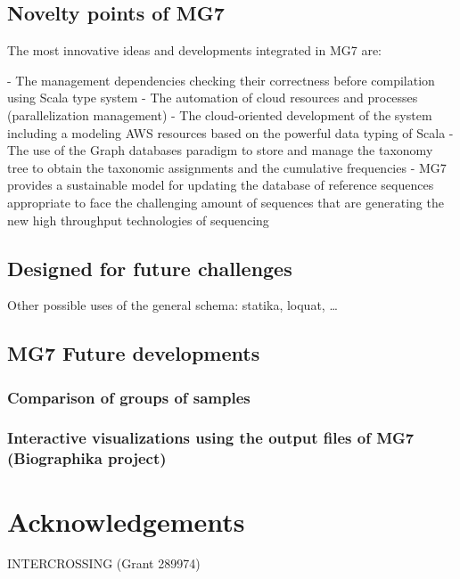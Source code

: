 \documentclass{frontiersSCNS} %
\begin{document}
\subsection{Novelty points of MG7}\label{novelty-points-of-mg7}

The most innovative ideas and developments integrated in MG7 are:

­- The management dependencies checking their correctness before
compilation using Scala type system - The automation of cloud resources
and processes (parallelization management) - The cloud-oriented
development of the system including a modeling AWS resources based on
the powerful data typing of Scala - The use of the Graph databases
paradigm to store and manage the taxonomy tree to obtain the taxonomic
assignments and the cumulative frequencies - MG7 provides a sustainable
model for updating the database of reference sequences appropriate to
face the challenging amount of sequences that are generating the new
high throughput technologies of sequencing

\subsection{Designed for future
challenges}\label{designed-for-future-challenges}

Other possible uses of the general schema: statika, loquat, \ldots{}

\subsection{MG7 Future developments}\label{mg7-future-developments}

\subsubsection{Comparison of groups of
samples}\label{comparison-of-groups-of-samples}

\subsubsection{Interactive visualizations using the output files of MG7
(Biographika
project)}\label{interactive-visualizations-using-the-output-files-of-mg7-biographika-project}

\section{Acknowledgements}\label{acknowledgements}

INTERCROSSING (Grant 289974)


\end{document}

